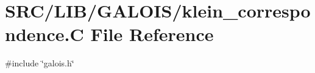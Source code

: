 \hypertarget{klein__correspondence_8_c}{}\section{S\+R\+C/\+L\+I\+B/\+G\+A\+L\+O\+I\+S/klein\+\_\+correspondence.C File Reference}
\label{klein__correspondence_8_c}
{\ttfamily \#include \char`\"{}galois.\+h\char`\"{}}\newline
